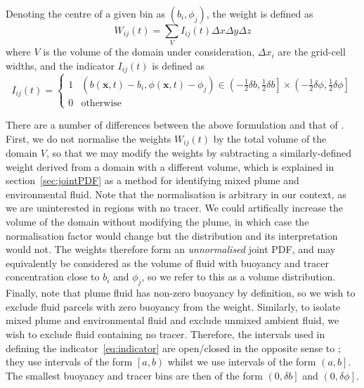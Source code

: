 \documentclass[a4paper]{article}
\begin{document}
Denoting the centre of a given bin as $(b_i, \phi_j)$, the weight is defined as
\begin{equation}
	W_{ij}(t) = \sum_V I_{ij}(t) \Delta x \Delta y \Delta z
\end{equation}
where $V$ is the volume of the domain under consideration, $\Delta x_i$ are the grid-cell widths, and the
indicator $I_{ij}(t)$ is defined as
\begin{equation}
	I_{ij}(t) = \begin{cases}
		1 & \left(b(\bm{x},t) - b_i, \phi(\bm{x},t) - \phi_j\right) \in \left( -\frac{1}{2}\delta b,
		\frac{1}{2}\delta b \right] \times \left( -\frac{1}{2}\delta \phi, \frac{1}{2}\delta \phi \right] \\
			0 & \text{otherwise}
		\end{cases}
		\label{eq:indicator}
\end{equation}

There are a number of differences between the above formulation and that of \citet{penney2020}. First, we do
not normalise the weights $W_{ij}(t)$ by the total volume of the domain $V$, so that we may modify the weights
by subtracting a similarly-defined weight derived from a domain with a different volume, which is explained in
section~\ref{sec:jointPDF} as a method for identifying mixed plume and environmental fluid. Note that the
normalisation is arbitrary in our context, as we are uninterested in regions with no tracer. We could
artifically increase the volume of the domain without modifying the plume, in which case the normalisation
factor would change but the distribution and its interpretation would not. The weights therefore form an
\emph{unnormalised} joint PDF, and may equivalently be considered as the volume of fluid with buoyancy and
tracer concentration close to $b_i$ and $\phi_j$, so we refer to this as a volume distribution. Finally, note
that plume fluid has non-zero buoyancy by definition, so we wish to exclude fluid parcels with zero buoyancy
from the weight. Similarly, to isolate mixed plume and environmental fluid and exclude unmixed ambient fluid,
we wish to exclude fluid containing no tracer. Therefore, the intervals used in defining the
indicator~\eqref{eq:indicator} are open/closed in the opposite sense to \citet{penney2020}; they use intervals
of the form $\left[a, b\right)$ whilst we use intervals of the form $\left(a, b\right]$. The smallest buoyancy
and tracer bins are then of the form $\left(0, \delta b\right]$ and $\left(0, \delta \phi\right]$. 
\end{document}
